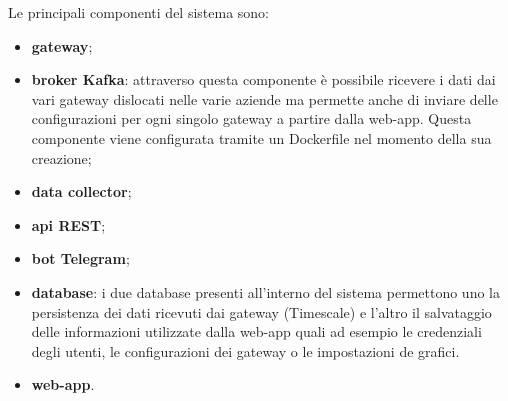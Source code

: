 		Le principali componenti del sistema sono:
		\begin{itemize}
		  	\item \textbf{gateway};
		  	\item \textbf{broker Kafka}: attraverso questa componente è possibile ricevere i dati dai vari gateway dislocati nelle varie aziende ma permette anche di inviare delle configurazioni per ogni singolo gateway a partire dalla web-app. Questa componente viene configurata tramite un Dockerfile nel momento della sua creazione;
		  	\item \textbf{data collector};
		  	\item \textbf{api REST};
		  	\item \textbf{bot Telegram};
		  	\item \textbf{database}: i due database presenti all'interno del sistema permettono uno la persistenza dei dati ricevuti dai gateway (Timescale) e l'altro il salvataggio delle informazioni utilizzate dalla web-app quali ad esempio le credenziali degli utenti, le configurazioni dei gateway o le impostazioni de grafici.
		  	\item \textbf{web-app}.    
		\end{itemize} 



			









